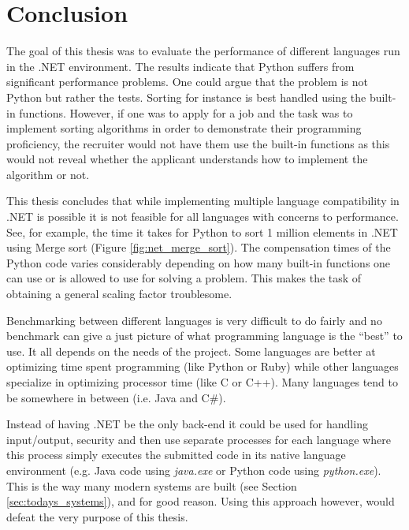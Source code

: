 \section{Conclusion}
The goal of this thesis was to evaluate the performance of different languages run in the .NET environment. The results indicate that Python suffers from significant performance problems. One could argue that the problem is not Python but rather the tests. Sorting for instance is best handled using the built-in functions. However, if one was to apply for a job and the task was to implement sorting algorithms in order to demonstrate their programming proficiency, the recruiter would not have them use the built-in functions as this would not reveal whether the applicant understands how to implement the algorithm or not.

This thesis concludes that while implementing multiple language compatibility in .NET is possible it is not feasible for all languages with concerns to performance. See, for example, the time it takes for Python to sort 1 million elements in .NET using Merge sort (Figure \ref{fig:net_merge_sort}). The compensation times of the Python code varies considerably depending on how many built-in functions one can use or is allowed to use for solving a problem. This makes the task of obtaining a general scaling factor troublesome.

Benchmarking between different languages is very difficult to do fairly and no benchmark can give a just picture of what programming language is the ``best'' to use. It all depends on the needs of the project. Some languages are better at optimizing time spent programming (like Python or Ruby) while other languages specialize in optimizing processor time (like C or C++). Many languages tend to be somewhere in between (i.e. Java and C\#).

Instead of having .NET be the only back-end it could be used for handling input/output, security and then use separate processes for each language where this process simply executes the submitted code in its native language environment (e.g. Java code using \textit{java.exe} or Python code using \textit{python.exe}). This is the way many modern systems are built (see Section \ref{sec:todays_systems}), and for good reason. Using this approach however, would defeat the very purpose of this thesis.
